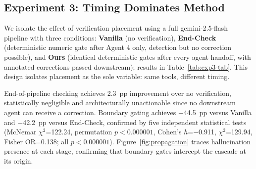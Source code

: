 \documentclass{article}
\theoremstyle{plain}
\theoremstyle{definition}
\theoremstyle{remark}
\begin{document}
\subsection{Experiment 3: Timing Dominates Method}
\label{sec:exp3}

We isolate the effect of verification placement using a full gemini-2.5-flash pipeline with three conditions: \textbf{Vanilla} (no verification), \textbf{End-Check} (deterministic numeric gate after Agent 4 only, detection but no correction possible), and \textbf{Ours} (identical deterministic gates after every agent handoff, with annotated corrections passed downstream); results in Table~\ref{tab:exp3-tab}. This design isolates placement as the sole variable: same tools, different timing.

\begin{table}[h]
\centering
{}
\vspace{5pt}
\caption{Hallucination survival and key metrics ($n$=346 hallucinations, $n$=140 questions).}
\label{tab:exp3-tab}
\end{table}

End-of-pipeline checking achieves 2.3~pp improvement over no verification, statistically negligible and architecturally unactionable since no downstream agent can receive a correction. Boundary gating achieves $-$44.5~pp versus Vanilla and $-$42.2~pp versus End-Check, confirmed by five independent statistical tests (McNemar $\chi^2$=122.24, permutation $p < 0.000001$, Cohen's $h$=$-$0.911, $\chi^2$=129.94, Fisher OR=0.138; all $p < 0.000001$). Figure~\ref{fig:propagation} traces hallucination presence at each stage, confirming that boundary gates intercept the cascade at its origin.
\end{document}
